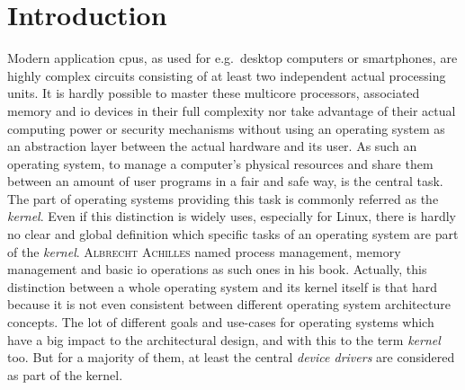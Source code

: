

\chapter{Introduction}\label{ch:introduction}



Modern application \acp{cpu}, as used for e.g.\ desktop computers or smartphones, are highly complex circuits consisting of at least two independent actual processing units.
It is hardly possible to master these multicore processors, associated memory and \ac{io} devices in their full complexity nor take advantage of their actual computing power or security mechanisms without using an operating system as an abstraction layer between the actual hardware and its user.
As such an operating system, to manage a computer's physical resources and share them between an amount of user programs in a fair and safe way, is the central task.
The part of operating systems providing this task is commonly referred as the \textit{kernel}.  
Even if this distinction is widely uses, especially for Linux, there is hardly no clear and global definition which specific tasks of an operating system are part of the \textit{kernel}.
\textsc{Albrecht Achilles} named process management, memory management and basic \ac{io} operations as such ones in his book\cite{achilles2006betriebssysteme}.
Actually, this distinction between a whole operating system and its kernel itself is that hard because it is not even consistent between different operating system architecture concepts.
The lot of different goals and use-cases for operating systems which have a big impact to the architectural design, and with this to the term \textit{kernel} too. 
But for a majority of them, at least the central \textit{device drivers} are considered as part of the kernel. 

